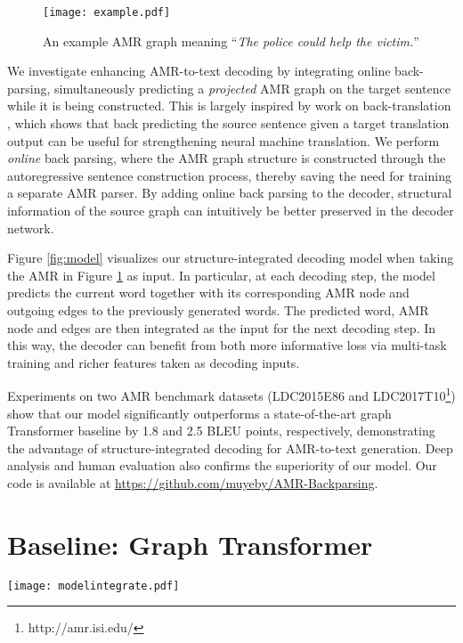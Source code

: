 \documentclass[11pt,a4paper]{article}
\begin{document}
\begin{figure}
\centering
	\texttt{[image: example.pdf]}
	\caption{An example AMR graph meaning ``\emph{The police could help the victim.}''}
	\label{fig:example}
\end{figure}


We investigate enhancing AMR-to-text decoding by integrating online back-parsing, simultaneously predicting a {\it projected} AMR graph on the target sentence while it is being constructed. This is largely inspired by work on back-translation \cite{sennrich2016improving,tu2017neural}, which shows that back predicting the source sentence given a target translation output can be useful for strengthening neural machine translation. We perform {\it online} back parsing, where the AMR graph structure is constructed through the autoregressive sentence construction process, thereby saving the need for training a separate AMR parser. By adding online back parsing to the decoder, structural information of the source graph can intuitively be better preserved in the decoder network.


Figure \ref{fig:model} visualizes our structure-integrated decoding model when taking the AMR in Figure \ref{fig:example} as input.
In particular, at each decoding step, the model predicts the current word together with its corresponding AMR node and outgoing edges to the previously generated words.
The predicted word, AMR node and edges are then integrated as the input for the next decoding step.
In this way, the decoder can benefit from both more informative loss via multi-task training and richer features taken as decoding inputs.


Experiments on two AMR benchmark datasets (LDC2015E86 and LDC2017T10\footnote{http://amr.isi.edu/}) show that our model significantly outperforms a state-of-the-art graph Transformer baseline by 1.8 and 2.5 BLEU points, respectively, demonstrating the advantage of structure-integrated decoding for AMR-to-text  generation.
Deep analysis and human evaluation also confirms the superiority of our model.
Our code is available at \url{https://github.com/muyeby/AMR-Backparsing}.

\section{Baseline: Graph Transformer}


\begin{figure*}
\centering
	\texttt{[image: modelintegrate.pdf]}
	\caption{Overview of the proposed model.}
	\label{fig:model}
\end{figure*}
\end{document}

